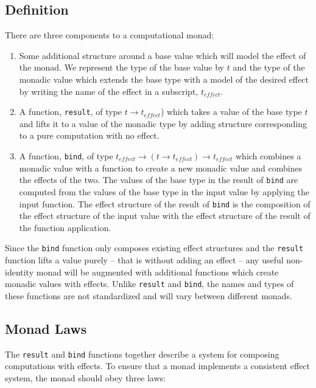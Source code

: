 \documentclass[preprint,natbib,10pt]{sigplanconf}
\begin{document}
\subsection{Definition}

There are three components to a computational monad:
\begin{enumerate}
\item
Some additional structure around a base value which will model the
effect of the monad.  We represent the type of the base value by
$t$ and the type of the monadic value which extends the base type
with a model of the desired effect by writing the name of the effect
in a subscript, $t_{effect}$.

\item
A function, {\tt result}, of type $t \rightarrow t_{effect}$) which
takes a value of the base type $t$ and lifts it to a value of the
monadic type by adding structure corresponding to a pure computation
with no effect.

\item
A function, {\tt bind}, of type $t_{effect} \rightarrow (t \rightarrow
t_{effect}) \rightarrow t_{effect}$ which combines a monadic value
with a function to create a new monadic value and combines the effects
of the two.  The values of the base type in the result of {\tt bind}
are computed from the values of the base type in the input value by
applying the input function.  The effect structure of the result of
{\tt bind} is the composition of the effect structure of the input
value with the effect structure of the result of the function
application.
\end{enumerate}

Since the {\tt bind} function only composes existing effect structures
and the {\tt result} function lifts a value purely -- that is without
adding an effect -- any useful non-identity monad will be augmented
with additional functions which create monadic values with effects.
Unlike {\tt result} and {\tt bind}, the names and types of these
functions are not standardized and will vary between different monads.

\subsection{Monad Laws}

The {\tt result} and {\tt bind} functions together describe a system
for composing computations with effects.  To ensure that a monad
implements a consistent effect system, the monad should obey three laws:
\end{document}
